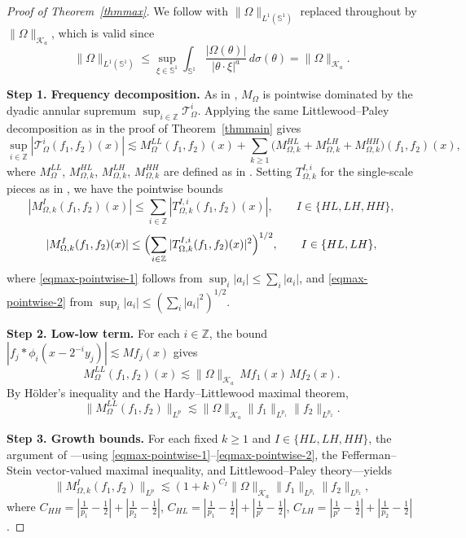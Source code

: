 \documentclass[11pt]{amsart}
\begin{document}
\begin{proof}[Proof of Theorem~\ref{thmmax}]
	We follow \cite[Section~7 and Theorem~1.7]{bhojak2025alternate} with
	$\|\Omega\|_{L^1(\mathbb S^1)}$ replaced throughout by
	$\|\Omega\|_{\mathcal K_a}$, which is valid since
	\[
	\|\Omega\|_{L^1(\mathbb S^1)}
	\le\sup_{\xi\in\mathbb S^1}\int_{\mathbb S^1}
	\frac{|\Omega(\theta)|}{|\theta\cdot\xi|^a}\,d\sigma(\theta)
	=\|\Omega\|_{\mathcal K_a}.
	\]
	
	\medskip
	\noindent
	\textbf{Step 1. Frequency decomposition.}
	As in \cite[Section~7]{bhojak2025alternate}, $M_\Omega$ is pointwise
	dominated by the dyadic annular supremum $\sup_{i\in\mathbb Z}
	\mathcal{T}_\Omega^i$. Applying the same Littlewood--Paley decomposition
	as in the proof of Theorem~\ref{thmmain} gives
	\[
	\sup_{i\in\mathbb Z}|\mathcal{T}_\Omega^i(f_1,f_2)(x)|
	\lesssim M_\Omega^{LL}(f_1,f_2)(x)
	+\sum_{k\ge 1}\bigl(M_{\Omega,k}^{HL}+M_{\Omega,k}^{LH}
	+M_{\Omega,k}^{HH}\bigr)(f_1,f_2)(x),
	\]
	where $M_\Omega^{LL}$, $M_{\Omega,k}^{HL}$, $M_{\Omega,k}^{LH}$,
	$M_{\Omega,k}^{HH}$ are defined as in
	\cite[Section~7]{bhojak2025alternate}.
	Setting $T_{\Omega,k}^{I,i}$ for the single-scale pieces as in
	\cite[(7.4)]{bhojak2025alternate}, we have the pointwise bounds
	\begin{equation}\label{eqmax-pointwise-1}
		|M_{\Omega,k}^I(f_1,f_2)(x)|
		\le\sum_{i\in\mathbb Z}|T_{\Omega,k}^{I,i}(f_1,f_2)(x)|,
		\qquad I\in\{HL,LH,HH\},
	\end{equation}
	\begin{equation}\label{eqmax-pointwise-2}
		|M_{\Omega,k}^I(f_1,f_2)(x)|
		\le\Bigl(\sum_{i\in\mathbb Z}
		|T_{\Omega,k}^{I,i}(f_1,f_2)(x)|^2\Bigr)^{1/2},
		\qquad I\in\{HL,LH\},
	\end{equation}
	where \eqref{eqmax-pointwise-1} follows from
	$\sup_i|a_i|\le\sum_i|a_i|$, and \eqref{eqmax-pointwise-2} from
	$\sup_i|a_i|\le(\sum_i|a_i|^2)^{1/2}$.
	
	\medskip
	\noindent
	\textbf{Step 2. Low-low term.}
	For each $i\in\mathbb Z$, the bound
	$|f_j*\phi_i(x-2^{-i}y_j)|\lesssim Mf_j(x)$ gives
	\[
	M_\Omega^{LL}(f_1,f_2)(x)
	\lesssim\|\Omega\|_{\mathcal K_a}\,Mf_1(x)\,Mf_2(x).
	\]
	By H\"older's inequality and the Hardy--Littlewood maximal theorem,
	\[
	\|M_\Omega^{LL}(f_1,f_2)\|_{L^p}
	\lesssim\|\Omega\|_{\mathcal K_a}
	\|f_1\|_{L^{p_1}}\|f_2\|_{L^{p_2}}.
	\]
	
	\medskip
	\noindent
	\textbf{Step 3. Growth bounds.}
	For each fixed $k\ge 1$ and $I\in\{HL,LH,HH\}$, the argument of
	\cite[Lemma~7.1(1)]{bhojak2025alternate}---using
	\eqref{eqmax-pointwise-1}--\eqref{eqmax-pointwise-2}, the
	Fefferman--Stein vector-valued maximal inequality, and
	Littlewood--Paley theory---yields
	\begin{equation}\label{eqM-growth}
		\|M_{\Omega,k}^I(f_1,f_2)\|_{L^p}
		\lesssim(1+k)^{C_I}\|\Omega\|_{\mathcal K_a}
		\|f_1\|_{L^{p_1}}\|f_2\|_{L^{p_2}},
	\end{equation}
	where $C_{HH}=|\frac1{p_1}-\frac12|+|\frac1{p_2}-\frac12|$,
	$C_{HL}=|\frac1{p_1}-\frac12|+|\frac1{p'}-\frac12|$,
	$C_{LH}=|\frac1{p'}-\frac12|+|\frac1{p_2}-\frac12|$.
	

\end{proof}
\end{document}
